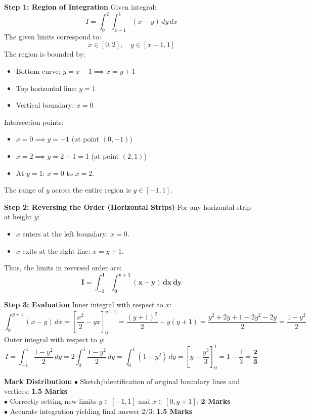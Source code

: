 \begin{solutionbox}
\textbf{Step 1: Region of Integration}
Given integral:
\[
I = \int_0^2 \int_{x-1}^1 (x - y) \, dy \, dx
\]
The given limits correspond to:
\[
x \in [0, 2], \quad y \in [x-1, 1]
\]
The region is bounded by:
\begin{itemize}[leftmargin=6mm]
    \item Bottom curve: $y = x - 1 \implies x = y + 1$
    \item Top horizontal line: $y = 1$
    \item Vertical boundary: $x = 0$
\end{itemize}
Intersection points:
\begin{itemize}[leftmargin=6mm]
    \item $x = 0 \implies y = -1$ (at point $(0, -1)$)
    \item $x = 2 \implies y = 2 - 1 = 1$ (at point $(2, 1)$)
    \item At $y = 1$: $x = 0$ to $x = 2$.
\end{itemize}
The range of $y$ across the entire region is $y \in [-1, 1]$.

\textbf{Step 2: Reversing the Order (Horizontal Strips)}
For any horizontal strip at height $y$:
\begin{itemize}[leftmargin=6mm]
    \item $x$ enters at the left boundary: $x = 0$.
    \item $x$ exits at the right line: $x = y + 1$.
\end{itemize}
Thus, the limits in reversed order are:
\[
\mathbf{I = \int_{-1}^1 \int_0^{y+1} (x - y) \, dx \, dy}
\]

\textbf{Step 3: Evaluation}
Inner integral with respect to $x$:
\[
\int_0^{y+1} (x - y) \, dx = \left[ \frac{x^2}{2} - y x \right]_0^{y+1} = \frac{(y+1)^2}{2} - y(y+1) = \frac{y^2 + 2y + 1 - 2y^2 - 2y}{2} = \frac{1 - y^2}{2}
\]
Outer integral with respect to $y$:
\[
I = \int_{-1}^1 \frac{1 - y^2}{2} \, dy = 2 \int_0^1 \frac{1 - y^2}{2} \, dy = \int_0^1 (1 - y^2) \, dy = \left[ y - \frac{y^3}{3} \right]_0^1 = 1 - \frac{1}{3} = \mathbf{\frac{2}{3}}
\]

\begin{markingrubric}
\textbf{Mark Distribution:}
$\bullet$ Sketch/identification of original boundary lines and vertices: \textbf{1.5 Marks}\\
$\bullet$ Correctly setting new limits $y \in [-1, 1]$ and $x \in [0, y+1]$: \textbf{2 Marks}\\
$\bullet$ Accurate integration yielding final answer $2/3$: \textbf{1.5 Marks}
\end{markingrubric}
\end{solutionbox}

